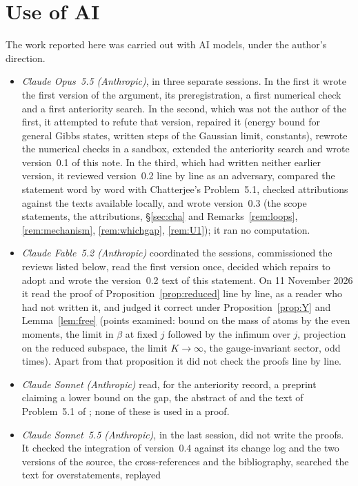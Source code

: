 \documentclass[11pt,a4paper]{article}
\theoremstyle{plain}
\theoremstyle{definition}
\theoremstyle{remark}
\numberwithin{equation}{section}
\begin{document}
\section*{Use of AI}\label{sec:ai}
The work reported here was carried out with AI models, under the author's direction.
\begin{itemize}
\item \emph{Claude Opus~5.5 (Anthropic)}, in three separate sessions. In the first it wrote the first version of the argument, its
preregistration, a first numerical check and a first anteriority search. In the second, which was not the author of the first, it
attempted to refute that version, repaired it (energy bound for general Gibbs states, written steps of the Gaussian limit, constants),
rewrote the numerical checks in a sandbox, extended the anteriority search and wrote version~0.1 of this note. In the third, which had
written neither earlier version, it reviewed version~0.2 line by line as an adversary, compared the statement word by word with
Chatterjee's Problem~5.1, checked attributions against the texts available locally, and wrote version~0.3 (the scope
statements, the attributions, \S\ref{sec:cha} and Remarks~\ref{rem:loops}, \ref{rem:mechanism}, \ref{rem:whichgap}, \ref{rem:U1});
it ran no computation.
\item \emph{Claude Fable~5.2 (Anthropic)} coordinated the sessions, commissioned the reviews listed below, read the first version
once, decided which repairs to adopt and wrote the version~0.2 text of this statement. On 11 November 2026 it read the proof of
Proposition~\ref{prop:reduced} line by line, as a reader who had not written it, and judged it correct under Proposition~\ref{prop:Y} and
Lemma~\ref{lem:free} (points examined: bound on the mass of atoms by the even moments, the limit in $\beta$ at fixed $j$ followed by the infimum over $j$,
projection on the reduced subspace, the limit $K\to\infty$, the gauge-invariant sector, odd times). Apart from that proposition it did not check the proofs line by line.
\item \emph{Claude Sonnet (Anthropic)} read, for the anteriority record, a preprint claiming a lower bound on the gap, the abstract of
\cite{Sei78} and the text of Problem~5.1 of \cite{Cha18}; none of these is used in a proof.
\item \emph{Claude Sonnet~5.5 (Anthropic)}, in the last session, did not write the proofs. It checked the integration of version~0.4 against
its change log and the two versions of the source, the cross-references and the bibliography, searched the text for overstatements, replayed

\end{itemize}
\end{document}
